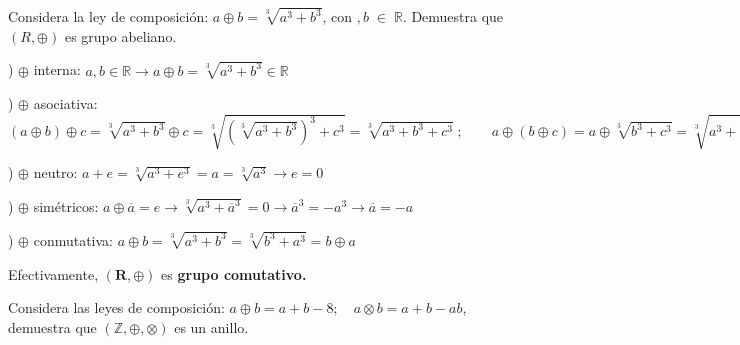 \begin{ejre} Considera la ley de composición: $a \oplus b=\sqrt[3]{a^3+b^3}$, con $, b\; \in \; \mathbb R$. Demuestra que $(R,\oplus)$ es grupo abeliano.
\end{ejre}

\begin{proofw}\renewcommand{\qedsymbol}{$\diamond$}

) $\oplus$ interna: $a,b\in \mathbb R \to 	a\oplus b=\sqrt[3]{a^3+b^3} \in \mathbb R$ 

) $\oplus$ asociativa: $(a \oplus b) \oplus c = \sqrt[3]{a^3+b^3} \oplus c = \sqrt[3]{(\sqrt[3]{a^3+b^3})^3+c^3}=\sqrt[3]{a^3+b^3+c^3}\; ; \qquad a\oplus(b \oplus c)= a \oplus \sqrt[3]{b^3+c^3} = \sqrt[3]{a^3+(\sqrt[3]{b^3+c^3})^3}= \sqrt[3]{a^3+b^3+c^3}$

) $\oplus$ neutro: $a+e=\sqrt[3]{a^3+e^3}=a=\sqrt[3]{a^3}\to e=0$

) $\oplus$ simétricos: $a\oplus \overline{a}=e \to \sqrt[3]{a^3+{\overline a}^3}=0 \to {\overline{a}}^3=-a^3 \to \overline{a}=-a$

) $\oplus$ conmutativa: $a \oplus b=\sqrt[3]{a^3+b^3}=\sqrt[3]{b^3+a^3}=b \oplus a$

Efectivamente, $\boldsymbol{(R,\oplus)}$ es \textbf{grupo comutativo.}
\end{proofw}

\begin{ejre} Considera las leyes de composición: $a\oplus b=a+b-8; \quad a \otimes b= a+b-ab$, demuestra que $(\mathbb Z, \oplus, \otimes)$ es un anillo.	
\end{ejre}

